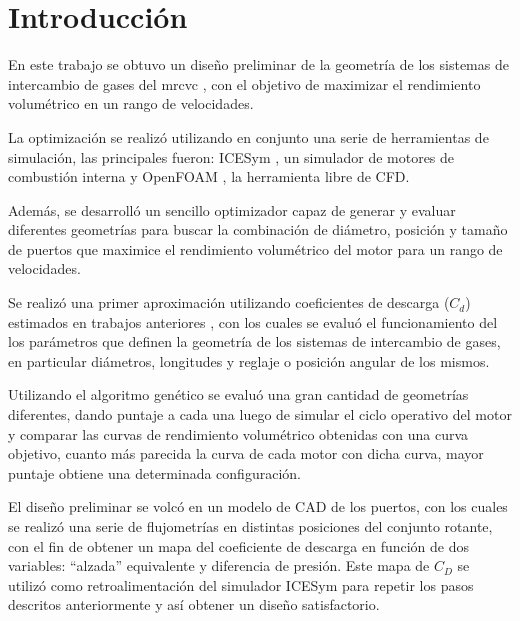 \chapter{Introducción}

En este trabajo se obtuvo un diseño preliminar de la geometría de los  sistemas
de intercambio de gases del  \gls{mrcvc} \cite{toth}, con el objetivo de
maximizar el rendimiento volumétrico en un rango de velocidades.

La optimización se realizó utilizando en conjunto una serie de herramientas de
simulación, las principales fueron: ICESym \cite{icesym}, un simulador de
motores de combustión interna y OpenFOAM \cite{openfoam}, la herramienta libre
de CFD.

Además, se desarrolló un sencillo optimizador capaz de generar y evaluar
diferentes geometrías para buscar la combinación de diámetro, posición y tamaño
de puertos que maximice el rendimiento volumétrico del motor para un rango de
velocidades.


Se realizó una primer aproximación utilizando coeficientes de descarga ($C_{d}$)
estimados en trabajos anteriores \cite{lopez13}, con los cuales se evaluó el
funcionamiento del los parámetros que definen la geometría de los sistemas de
intercambio de gases, en particular diámetros, longitudes y reglaje o posición
angular de los mismos.

Utilizando el algoritmo genético se evaluó una gran cantidad de geometrías
diferentes, dando puntaje a cada una luego de simular el ciclo operativo del
motor y comparar las curvas de rendimiento volumétrico obtenidas con una curva
objetivo, cuanto más parecida la curva de cada motor con dicha curva, mayor
puntaje obtiene una determinada configuración.


El diseño preliminar se volcó en un modelo de CAD de los puertos, con los cuales
se realizó una serie de flujometrías en distintas posiciones del conjunto
rotante, con el fin de obtener un mapa del coeficiente de descarga en
función de dos variables: ``alzada'' equivalente y diferencia de presión.
%
Este mapa de $C_{D}$ se utilizó como retroalimentación del simulador ICESym
para repetir los pasos descritos anteriormente y así obtener un diseño
satisfactorio.

